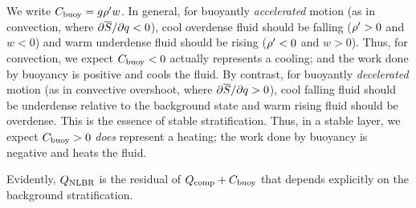 \documentclass[12pt]{article}
\newcommand{\heatnlbr}{Q_{\rm NLBR}}
\newcommand{\heatnomassflux}{Q_{\rm nomassflux}}
\newcommand{\heatcomp}{Q_{\rm comp}}
\newcommand{\heatbuoy}{C_{\rm buoy}}
\begin{document}
We write $\heatbuoy=g\rhoprime w$. In general, for buoyantly \textit{accelerated} motion (as in convection, where $\partial\overline{S}/\partial q<0$), cool overdense fluid should be falling (${\rho^\prime}>0$ and $w<0$) and warm underdense fluid should be rising (${\rho^\prime}<0$ and $w>0$). Thus, for convection, we expect $\heatbuoy<0$ actually represents a cooling; and the work done by buoyancy is positive and cools the fluid. By contrast, for buoyantly \textit{decelerated} motion (as in convective overshoot, where $\partial\overline{S}/\partial q>0$), cool falling fluid should be underdense relative to the background state and warm rising fluid should be overdense. This is the essence of stable stratification. Thus, in a stable layer, we expect $\heatbuoy > 0$ \textit{does} represent a heating; the work done by buoyancy is negative and heats the fluid. 

Evidently, $\heatnlbr$ is the residual of $\heatcomp+\heatbuoy$ that depends explicitly on the background stratification. 


\end{document}
